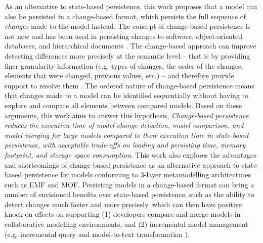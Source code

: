 \documentclass[sigplan,review,anonymous]{acmart}\settopmatter{printfolios=true,printccs=false,printacmref=false}
\begin{document}
As an alternative to state-based persistence, this work proposes that a model can also be persisted in a change-based format, which persists the full sequence of \emph{changes} made to the model instead. The concept of change-based persistence is not new and has been used in persisting changes to software, object-oriented databases, and hierarchical documents \cite{DBLP:journals/entcs/RobbesL07,DBLP:conf/sde/LippeO92,DBLP:conf/caise/IgnatN05}. The change-based approach can improve detecting differences more precisely at the semantic level -- that is by providing finer-granularity information (e.g. types of changes, the order of the changes, elements that were changed, previous values, etc.) -- and therefore provide support to resolve them \cite{mens2002state}. The ordered nature of change-based persistence means that changes made to a model can be identified sequentially without having to explore and compare all elements between compared models. Based on these arguments, this work aims to answer this hypothesis, \textit{Change-based persistence reduces the execution time of model change-detection, model comparison, and model merging for large models compared to their execution time in state-based persistence, with acceptable trade-offs on loading and persisting time, memory footprint, and storage space consumption}. This work also explores the advantages and shortcomings of change-based persistence as an alternative approach to state-based persistence for models conforming to 3-layer metamodelling architectures such as EMF and MOF. Persisting models in a change-based format can bring a number of envisioned benefits over state-based persistence, such as the ability to detect changes much faster and more precisely, which can then have positive knock-on effects on supporting (1) developers compare and merge models in collaborative modelling environments, and (2) incremental model management (e.g. incremental query \cite{DBLP:conf/ecmdafa/RathHV12} and model-to-text transformation \cite{DBLP:conf/ecmdafa/OgunyomiRK15}). 
\end{document}
